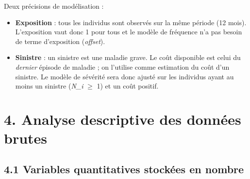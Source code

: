 \documentclass[

  french,

  10pt,

  a4paper,

]{article}
\providecommand{\tightlist}{%

  \setlength{\itemsep}{0pt}\setlength{\parskip}{0pt}}
\begin{document}
Deux précisions de modélisation :



\begin{itemize}

\tightlist

\item

  \textbf{Exposition} : tous les individus sont observés sur la même période (12 mois). L'exposition vaut donc 1 pour tous et le modèle de fréquence n'a pas besoin de terme d'exposition (\emph{offset}).

\item

  \textbf{Sinistre} : un sinistre est une maladie grave. Le coût disponible est celui du \emph{dernier} épisode de maladie ; on l'utilise comme estimation du coût d'un sinistre. Le modèle de sévérité sera donc ajusté sur les individus ayant au moins un sinistre (\emph{N\_i} \ensuremath{\geq} 1) et un coût positif.

\end{itemize}



\section{4. Analyse descriptive des données brutes}



\subsection{4.1 Variables quantitatives stockées en nombre}
\end{document}
